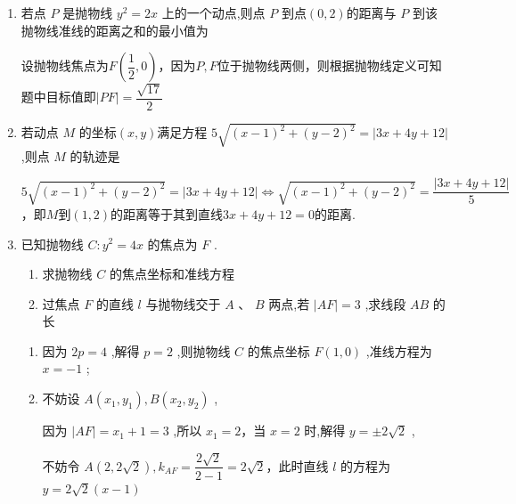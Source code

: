 \begin{enumerate}
    \item 若点 $P$ 是抛物线 ${y}^{2} = {2x}$ 上的一个动点,则点 $P$ 到点$(0,2)$的距离与 $P$ 到该抛物线准线的距离之和的最小值为
    \begin{jieda}
        设抛物线焦点为$F\left(\dfrac{1}{2}, 0\right)$，因为$P,F$位于抛物线两侧，则根据抛物线定义可知题中目标值即$|PF| = \dfrac{\sqrt{17}}{2}$
    \end{jieda}
    
    \item 若动点 $M$ 的坐标$(x, y)$满足方程 $5\sqrt{{\left( x - 1\right) }^{2} + {\left( y - 2\right) }^{2}} = \left| {{3x} + {4y} + {12}}\right|$ ,则点 $M$ 的轨迹是
    \begin{jieda}
        $5\sqrt{{\left( x - 1\right) }^{2} + {\left( y - 2\right) }^{2}} = \left| {{3x} + {4y} + {12}}\right| \Longleftrightarrow \sqrt{{\left( x - 1\right) }^{2} + {\left( y - 2\right) }^{2}} = \dfrac{\left| {{3x} + {4y} + {12}}\right|}{5}$，即$M$到$(1,2)$的距离等于其到直线$3x+4y+12 = 0$的距离.
    \end{jieda}
    
    \item 已知抛物线 $C : {y}^{2} = {4x}$ 的焦点为 $F$ .
    \begin{enumerate}
        \item 求抛物线 $C$ 的焦点坐标和准线方程
        \item 过焦点 $F$ 的直线 $l$ 与抛物线交于 ${A}$ 、 $B$ 两点,若 $\left| {AF}\right|  = 3$ ,求线段 $AB$ 的长
    \end{enumerate}
    \begin{jieda}
        \begin{enumerate}
            \item 因为 ${2p} = 4$ ,解得 $p = 2$ ,则抛物线 $C$ 的焦点坐标 $F\left( {1,0}\right)$ ,准线方程为 $x =  - 1$ ;
            
            \item 不妨设 $A\left( {{x}_{1},{y}_{1}}\right) ,B\left( {{x}_{2},{y}_{2}}\right)$ ,
            
            因为 $\left| {AF}\right|  = {x}_{1} + 1 = 3$ ,所以 ${x}_{1} = 2$，当 $x = 2$ 时,解得 $y =  \pm  2\sqrt{2}$ ,
            
            不妨令 $A\left( {2,2\sqrt{2}}\right) ,{k}_{AF} = \dfrac{2\sqrt{2}}{2 - 1} = 2\sqrt{2}$，此时直线 $l$ 的方程为 $y = 2\sqrt{2}\left( {x - 1}\right)$
            

\end{enumerate}
\end{jieda}
\end{enumerate}
